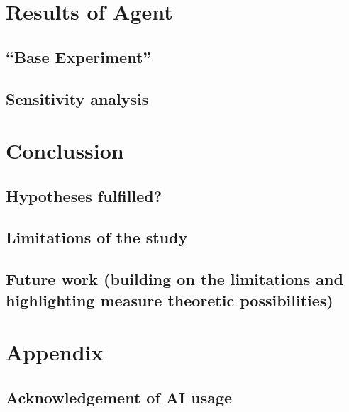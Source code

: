 \documentclass[
  12pt,
]{article}
\begin{document}
\newpage{}

\section{Results of Agent}\label{results-of-agent}

\subsection{``Base Experiment''}\label{base-experiment}

\subsection{Sensitivity analysis}\label{sensitivity-analysis}

\newpage{}

\section{Conclussion}\label{conclussion}

\subsection{Hypotheses fulfilled?}\label{hypotheses-fulfilled}

\subsection{Limitations of the study}\label{limitations-of-the-study}

\subsection{Future work (building on the limitations and highlighting
measure theoretic
possibilities)}\label{future-work-building-on-the-limitations-and-highlighting-measure-theoretic-possibilities}

\newpage{}

\section{Appendix}\label{appendix}

\subsection{Acknowledgement of AI
usage}\label{acknowledgement-of-ai-usage}
\end{document}
